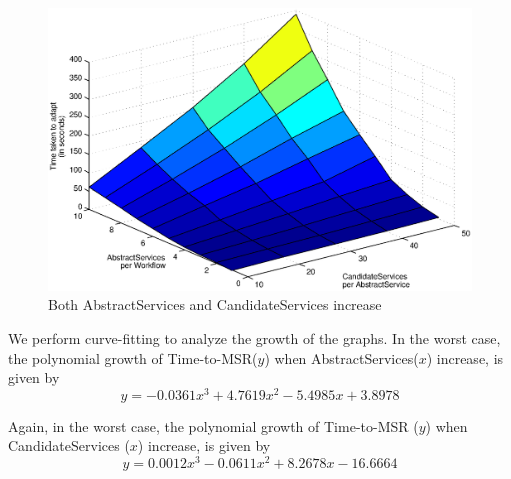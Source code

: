 \documentclass[10pt,journal,compsoc]{IEEEtran}
\begin{document}
\begin{figure}[htbp]
	\centering
	\includegraphics[clip, trim=1cm 10cm 0cm 7cm,scale=0.47]{Figure14.eps}
	\caption{Both AbstractServices and CandidateServices increase \label{fig:task_and_candidate_scaling}}
\end{figure}
% 
We perform curve-fitting to analyze the growth of the graphs. In the worst case, the polynomial growth of Time-to-MSR($y$) when AbstractServices($x$) increase, is given by
\begin{equation}
    y =  -0.0361x^{3} +   4.7619x^{2}  - 5.4985x +   3.8978 \label{eq:task_vs_cand}
\end{equation}

Again, in the worst case, the polynomial growth of Time-to-MSR ($y$) when CandidateServices ($x$) increase, is given by
\begin{equation}
    y =  0.0012x^{3} - 0.0611x^{2} +  8.2678x - 16.6664 \label{eq:cand_vs_task}
\end{equation}
\end{document}
